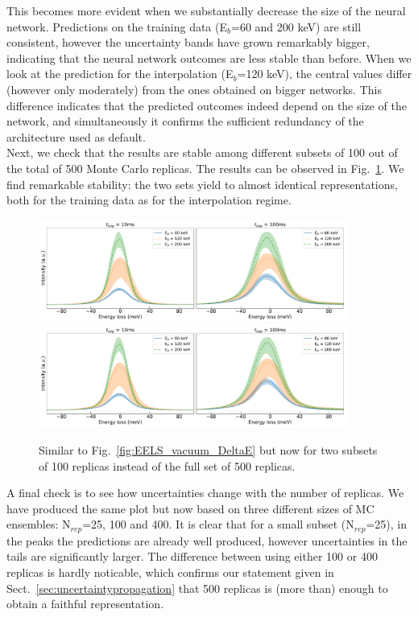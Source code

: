 This becomes more evident when we substantially decrease the size of the neural network.
Predictions on the training data (E$_b$=60 and 200 keV) are still consistent, however the uncertainty
bands have grown remarkably bigger, indicating that the neural network outcomes are less 
stable than before. 
%
When we look at the prediction for the interpolation (E$_b$=120 keV), the central 
values differ (however only moderately) from the ones obtained on bigger networks.
%
This difference indicates that the predicted outcomes indeed depend on the size of the network,
and simultaneously it confirms the sufficient redundancy of the architecture used as default. \\

Next, we check that the results are stable among different subsets of 100 out of the 
total of 500 Monte Carlo replicas. 
%
The results can be observed in Fig.~\ref{fig:EELS_vacuum_DeltaE_check2}.
%
We find remarkable stability: the two sets yield to almost identical representations,
both for the training data as for the interpolation regime. 
%
\begin{figure}[h]
\centering
 \includegraphics[width=0.9\textwidth]{plots/Prediction_120keV_100replicas_part1.pdf}
 \includegraphics[width=0.9\textwidth]{plots/Prediction_120keV_100replicas_part2.pdf}
 \caption{Similar to Fig.~\ref{fig:EELS_vacuum_DeltaE} but now for two subsets of 100 replicas
 instead of the full set of 500 replicas.}
    \label{fig:EELS_vacuum_DeltaE_check2}
\end{figure}

A final check is to see how uncertainties change with the number of replicas. 
We have produced the same plot but now based on three different sizes of MC ensembles:
N$_{rep}$=25, 100 and 400. 
%
It is clear that for a small subset (N$_{rep}$=25), in the peaks the predictions are
already well produced, however uncertainties in the tails are significantly larger.
%
The difference between using either 100 or 400 replicas is hardly noticable, which
confirms our statement given in Sect.~\ref{sec:uncertaintypropagation} that 500
replicas is (more than) enough to obtain a faithful representation.

